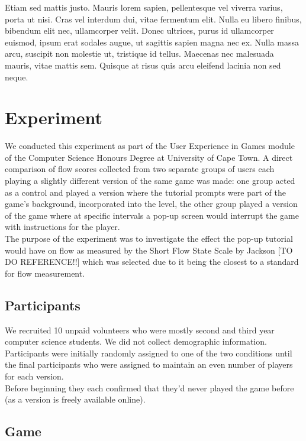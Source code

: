 \documentclass{acmsiggraph}
\begin{document}
  
Etiam sed mattis justo. Mauris lorem sapien, pellentesque vel viverra varius, porta ut nisi. Cras vel interdum dui, vitae fermentum elit. Nulla eu libero finibus, bibendum elit nec, ullamcorper velit. Donec ultrices, purus id ullamcorper euismod, ipsum erat sodales augue, ut sagittis sapien magna nec ex. Nulla massa arcu, suscipit non molestie ut, tristique id tellus. Maecenas nec malesuada mauris, vitae mattis sem. Quisque at risus quis arcu eleifend lacinia non sed neque.

\section{Experiment}

We conducted this experiment as part of the User Experience in Games module of the Computer Science Honours Degree at University of Cape Town. A direct comparison of flow scores collected from two separate groups of users each playing a slightly different version of the same game was made: one group acted as a control and played a version where the tutorial prompts were part of the game's background, incorporated into the level, the other group played a version of the game where at specific intervals a pop-up screen would interrupt the game with instructions for the player.\\
The purpose of the experiment was to investigate the effect the pop-up tutorial would have on flow as measured by the Short Flow State Scale by Jackson [TO DO REFERENCE!!] which was selected due to it being the closest to a standard for flow measurement.

\subsection{Participants}

We recruited 10 unpaid volunteers who were mostly second and third year computer science students. We did not collect demographic information. Participants were initially randomly assigned to one of the two conditions until the final participants who were assigned to maintain an even number of players for each version.\\
Before beginning they each confirmed that they'd never played the game before (as a version is freely available online).

\subsection{Game}
\end{document}
